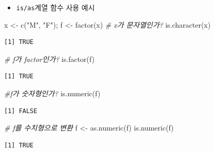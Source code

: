 \documentclass[
  11pt,
]{krantz}
\newenvironment{Shaded}{\begin{snugshade}}{\end{snugshade}}
\newcommand{\CommentTok}[1]{\textcolor[rgb]{0.37,0.37,0.37}{\textit{#1}}}
\newcommand{\FunctionTok}[1]{\textcolor[rgb]{0,0,0}{#1}}
\newcommand{\NormalTok}[1]{#1}
\newcommand{\OtherTok}[1]{\textcolor[rgb]{0.37,0.37,0.37}{#1}}
\newcommand{\StringTok}[1]{\textcolor[rgb]{0.5,0.5,0.5}{#1}}
\providecommand{\tightlist}{%
  \setlength{\itemsep}{0pt}\setlength{\parskip}{0pt}}
\begin{document}
\normalsize

\begin{itemize}
\tightlist
\item
  \texttt{is/as}계열 함수 사용 예시
\end{itemize}

\footnotesize

\begin{Shaded}
\begin{Highlighting}[]
\NormalTok{x }\OtherTok{\textless{}{-}} \FunctionTok{c}\NormalTok{(}\StringTok{"M"}\NormalTok{, }\StringTok{"F"}\NormalTok{); f }\OtherTok{\textless{}{-}} \FunctionTok{factor}\NormalTok{(x)}
\CommentTok{\# x가 문자열인가?}
\FunctionTok{is.character}\NormalTok{(x)}
\end{Highlighting}
\end{Shaded}

\begin{verbatim}
[1] TRUE
\end{verbatim}

\begin{Shaded}
\begin{Highlighting}[]
\CommentTok{\# f가 factor인가?}
\FunctionTok{is.factor}\NormalTok{(f)}
\end{Highlighting}
\end{Shaded}

\begin{verbatim}
[1] TRUE
\end{verbatim}

\begin{Shaded}
\begin{Highlighting}[]
\CommentTok{\#f가 숫자형인가?}
\FunctionTok{is.numeric}\NormalTok{(f)}
\end{Highlighting}
\end{Shaded}

\begin{verbatim}
[1] FALSE
\end{verbatim}

\begin{Shaded}
\begin{Highlighting}[]
\CommentTok{\# f를 수치형으로 변환}
\NormalTok{f }\OtherTok{\textless{}{-}} \FunctionTok{as.numeric}\NormalTok{(f)}
\FunctionTok{is.numeric}\NormalTok{(f)}
\end{Highlighting}
\end{Shaded}

\begin{verbatim}
[1] TRUE
\end{verbatim}
\end{document}
